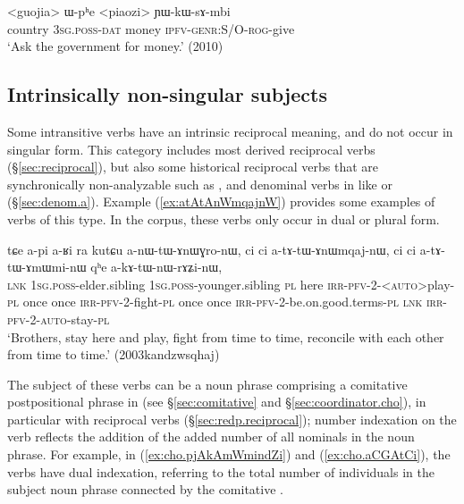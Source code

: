 \begin{exe}
\ex   \label{ex:Wphe.piaozi}
 \gll <guojia> ɯ-pʰe <piaozi> ɲɯ-kɯ-sɤ-mbi \\
country \textsc{3sg}.\textsc{poss}-\textsc{dat} money \textsc{ipfv}-\textsc{genr}:S/O-\textsc{rog}-give \\
\glt `Ask the government for money.' (2010)
\end{exe}

\subsection{Intrinsically non-singular subjects} \label{sec:intrinsically.n.sg.subject}
    
Some intransitive verbs have an intrinsic reciprocal meaning, and do not occur in singular form. This category includes most derived reciprocal verbs (§\ref{sec:reciprocal}), but also some historical reciprocal verbs that are synchronically non-analyzable such as , and denominal verbs in  like  or  (§\ref{sec:denom.a}). Example (\ref{ex:atAtAnWmqajnW}) provides some examples of verbs of this type. In the corpus, these verbs only occur in dual or plural form.

\begin{exe}
\ex   \label{ex:atAtAnWmqajnW}
 \gll tɕe a-pi a-ʁi ra kutɕu a-nɯ-tɯ-ɤnɯɣro-nɯ, ci ci a-tɤ-tɯ-ɤnɯmqaj-nɯ, ci ci a-tɤ-tɯ-ɤmɯmi-nɯ qʰe a-kɤ-tɯ-nɯ-rɤʑi-nɯ, \\
\textsc{lnk} \textsc{1sg}.\textsc{poss}-elder.sibling  \textsc{1sg}.\textsc{poss}-younger.sibling \textsc{pl}  here \textsc{irr}-\textsc{pfv}-2-<\textsc{auto}>play-\textsc{pl} once once \textsc{irr}-\textsc{pfv}-2-fight-\textsc{pl} once once \textsc{irr}-\textsc{pfv}-2-be.on.good.terms-\textsc{pl} \textsc{lnk} \textsc{irr}-\textsc{pfv}-2-\textsc{auto}-stay-\textsc{pl}\\
\glt `Brothers, stay here and play, fight from time to time, reconcile with each other from time to time.' (2003kandzwsqhaj)
\end{exe}

The subject of these verbs can be a noun phrase comprising a comitative postpositional phrase in  (see §\ref{sec:comitative} and §\ref{sec:coordinator.cho}), in particular with reciprocal verbs (§\ref{sec:redp.reciprocal}); number indexation on the verb reflects the addition of the added number of all nominals in the noun phrase. For example, in (\ref{ex:cho.pjAkAmWmindZi}) and (\ref{ex:cho.aCGAtCi}), the verbs have dual indexation, referring to the total number of individuals in the subject noun phrase connected by the comitative .


